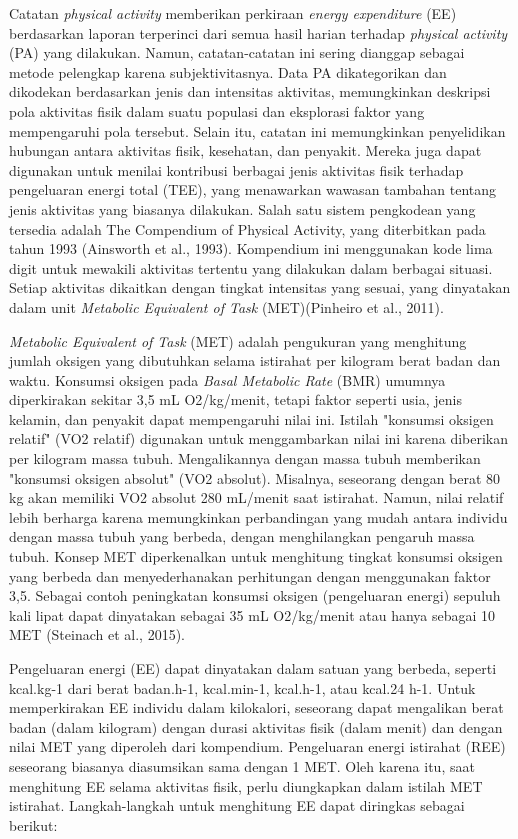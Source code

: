 Catatan \emph{physical activity} memberikan perkiraan \emph{energy expenditure} (EE) berdasarkan laporan terperinci dari semua hasil harian terhadap \emph{physical activity} (PA) yang dilakukan. Namun, catatan-catatan ini sering dianggap sebagai metode pelengkap karena subjektivitasnya. Data PA dikategorikan dan dikodekan berdasarkan jenis dan intensitas aktivitas, memungkinkan deskripsi pola aktivitas fisik dalam suatu populasi dan eksplorasi faktor yang mempengaruhi pola tersebut. Selain itu, catatan ini memungkinkan penyelidikan hubungan antara aktivitas fisik, kesehatan, dan penyakit. Mereka juga dapat digunakan untuk menilai kontribusi berbagai jenis aktivitas fisik terhadap pengeluaran energi total (TEE), yang menawarkan wawasan tambahan tentang jenis aktivitas yang biasanya dilakukan. Salah satu sistem pengkodean yang tersedia adalah The Compendium of Physical Activity, yang diterbitkan pada tahun 1993 (Ainsworth et al., 1993). Kompendium ini menggunakan kode lima digit untuk mewakili aktivitas tertentu yang dilakukan dalam berbagai situasi. Setiap aktivitas dikaitkan dengan tingkat intensitas yang sesuai, yang dinyatakan dalam unit \emph{Metabolic Equivalent of Task} (MET)(Pinheiro et al., 2011).

\emph{Metabolic Equivalent of Task} (MET) adalah pengukuran yang menghitung jumlah oksigen yang dibutuhkan selama istirahat per kilogram berat badan dan waktu. Konsumsi oksigen pada \emph{Basal Metabolic Rate} (BMR) umumnya diperkirakan sekitar 3,5 mL O2/kg/menit, tetapi faktor seperti usia, jenis kelamin, dan penyakit dapat mempengaruhi nilai ini. Istilah "konsumsi oksigen relatif" (VO2 relatif) digunakan untuk menggambarkan nilai ini karena diberikan per kilogram massa tubuh. Mengalikannya dengan massa tubuh memberikan "konsumsi oksigen absolut" (VO2 absolut). Misalnya, seseorang dengan berat 80 kg akan memiliki VO2 absolut 280 mL/menit saat istirahat. Namun, nilai relatif lebih berharga karena memungkinkan perbandingan yang mudah antara individu dengan massa tubuh yang berbeda, dengan menghilangkan pengaruh massa tubuh. Konsep MET diperkenalkan untuk menghitung tingkat konsumsi oksigen yang berbeda dan menyederhanakan perhitungan dengan menggunakan faktor 3,5. Sebagai contoh peningkatan konsumsi oksigen (pengeluaran energi) sepuluh kali lipat dapat dinyatakan sebagai 35 mL O2/kg/menit atau hanya sebagai 10 MET (Steinach et al., 2015).

Pengeluaran energi (EE) dapat dinyatakan dalam satuan yang berbeda, seperti kcal.kg-1 dari berat badan.h-1, kcal.min-1, kcal.h-1, atau kcal.24 h-1. Untuk memperkirakan EE individu dalam kilokalori, seseorang dapat mengalikan berat badan (dalam kilogram) dengan durasi aktivitas fisik (dalam menit) dan dengan nilai MET yang diperoleh dari kompendium. Pengeluaran energi istirahat (REE) seseorang biasanya diasumsikan sama dengan 1 MET. Oleh karena itu, saat menghitung EE selama aktivitas fisik, perlu diungkapkan dalam istilah MET istirahat. Langkah-langkah untuk menghitung EE dapat diringkas sebagai berikut:

